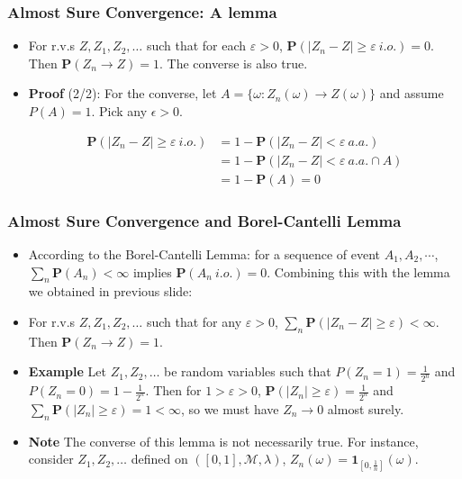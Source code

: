 \documentclass[handout]{beamer}
\newcommand{\BP}{\mathbf{P}}
\newcommand{\BI}{\mathbf{1}}
\begin{document}
\frame
{
  \frametitle{Almost Sure Convergence: A lemma}

   \begin{itemize}
       \item<1->[]
       \begin{Lemma}[5.2.1] 
       For r.v.s $Z, Z_1, Z_2, \ldots $ such that for each $\varepsilon>0$, $\BP(|Z_n-Z| \geq \varepsilon \  i.o.)=0$. Then $\BP(Z_n\rightarrow Z)=1$. The converse is also true.
       \end{Lemma}       
 
\item<2-> \textbf{Proof} (2/2): For the converse, let $A = \{\omega : Z_n(\omega) \to Z(\omega)\}$ and assume $P(A) = 1$. Pick any $\epsilon > 0$.

\begin{align*}
\BP(|Z_n-Z| \geq \varepsilon \  i.o.) 
&= 1 - \BP(|Z_n-Z| < \varepsilon \  a.a.) \\
&= 1 - \BP(|Z_n-Z| < \varepsilon \  a.a. \cap A) \\
&= 1 - \BP(A) = 0
\end{align*}
    

                              
\end{itemize}
}




\frame
{
  \frametitle{Almost Sure Convergence and Borel-Cantelli Lemma}

   \begin{itemize}
       \item<1-> According to the  Borel-Cantelli Lemma: for a sequence of event $A_1, A_2, \cdots$, $\sum_n \BP(A_n) <\infty$ implies $\BP(A_n \ i.o. )=0$. Combining this with the lemma we obtained in previous slide: 
       
   \item<2->[]     \begin{Lemma} For r.v.s $Z, Z_1, Z_2, \ldots $ such that for any $\varepsilon>0$, $\sum_n \BP(|Z_n-Z| \geq \varepsilon)<\infty$. Then $\BP(Z_n\rightarrow Z)=1$.   \end{Lemma}       

  \item<3-> \textbf{Example} Let $Z_1, Z_2, \ldots$ be random variables such that $P(Z_n=1)=\frac{1}{2^n}$ and $P(Z_n=0)=1-\frac{1}{2^n}$. Then for $1>\varepsilon>0$, $\BP(|Z_n|\geq \varepsilon)=\frac{1}{2^n}$ and $\sum_n \BP(|Z_n|\geq \varepsilon)=1<\infty$, so we must have $Z_n\rightarrow 0$ almost surely. 
  
  
  \item<4-> \textbf{Note}  The converse of this lemma is not necessarily true. For instance, consider $Z_1, Z_2,\ldots$ defined on $([0,1],\mathcal{M}, \lambda)$, $Z_n(\omega)=\BI_{[0,\frac{1}{n}]} (\omega)$.                              
\end{itemize}
}
\end{document}
